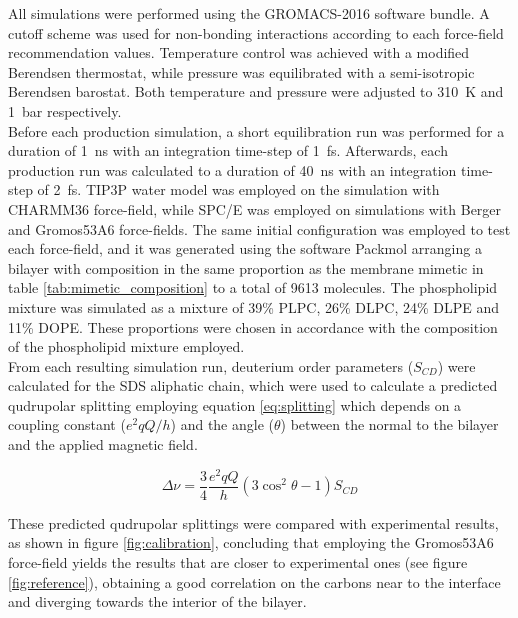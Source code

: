 \documentclass[twoside,twocolumn,9pt]{article}
\begin{document}
All simulations were performed using the GROMACS-2016\cite{Abraham2015} software
bundle. A cutoff scheme was used for non-bonding interactions according to each
force-field recommendation values. Temperature control was achieved with a
modified Berendsen thermostat\cite{Bussi2007}, while pressure was equilibrated
with a semi-isotropic Berendsen barostat\cite{Berendsen1984}. Both temperature
and
pressure were adjusted to \SI{310}{K} and \SI{1}{bar} respectively.\\
Before each production simulation, a short equilibration run was performed for a
duration of \SI{1}{ns} with an integration time-step of \SI{1}{fs}. Afterwards,
each production run was calculated to a duration of \SI{40}{ns} with an
integration time-step of \SI{2}{fs}. TIP3P water model was employed on the
simulation with CHARMM36 force-field, while SPC/E was employed on simulations
with Berger and Gromos53A6 force-fields. The same initial configuration was
employed to test each force-field, and it was generated using the software
Packmol\cite{Martinez2009} arranging a bilayer with composition in the same
proportion as the membrane mimetic in table \ref{tab:mimetic_composition} to a
total of 9613 molecules. The phospholipid mixture was simulated as a mixture of
39\% PLPC, 26\% DLPC, 24\% DLPE and 11\% DOPE. These proportions were chosen in
accordance with the composition of the phospholipid mixture employed.\\

From each resulting simulation run, deuterium order parameters ($S_{CD}$) were calculated
for the SDS aliphatic chain, which were used to calculate a predicted qudrupolar
splitting employing equation \ref{eq:splitting} which depends on a coupling
constant ($e^2qQ/h$) and the angle ($\theta$) between the normal to the bilayer and the
applied magnetic field.

\begin{equation}
  \label{eq:splitting}
  \Delta\nu = \frac{3}{4} \frac{e^2qQ}{h}(3\cos^2\theta - 1) S_{CD}
\end{equation}

These predicted qudrupolar splittings were compared with experimental results,
as shown in figure \ref{fig:calibration}, concluding that employing the
Gromos53A6 force-field yields the results that are closer to experimental ones
(see figure \ref{fig:reference}), obtaining a good correlation on the carbons
near to the interface and diverging towards the interior of the bilayer.
\end{document}
